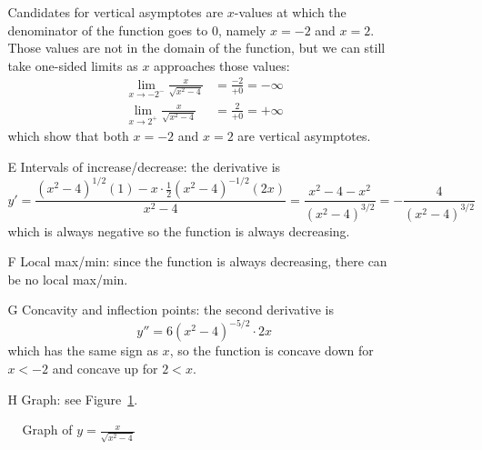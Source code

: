 \documentclass{article}
\newcommand{\ds}{\displaystyle}
\begin{document}
\begin{enumerate}
\begin{enumerate}
\begin{itemize}
      Candidates for vertical asymptotes are $x$-values at which the
      denominator of the function goes to $0$, namely $x=-2$ and
      $x=2$.  Those values are not in the domain of the function, but
      we can still take one-sided limits as $x$ approaches those
      values:
      \begin{align*}
        \lim_{x\to -2^-} \frac{x}{\sqrt{x^2-4}} &= \frac{-2}{+0} = -\infty
        \\
        \lim_{x\to 2^+} \frac{x}{\sqrt{x^2-4}} &= \frac{2}{+0} = +\infty
      \end{align*}
      which show that both $x=-2$ and $x=2$ are vertical asymptotes.
    \item[E] Intervals of increase/decrease: the derivative is
      \begin{displaymath}
        y'=\frac{(x^2-4)^{1/2}(1)-x\cdot\frac{1}{2}(x^2-4)^{-1/2}(2x)}{x^2-4}
        = \frac{x^2-4-x^2}{(x^2-4)^{3/2}} = -\frac{4}{(x^2-4)^{3/2}}
      \end{displaymath}
      which is always negative so the function is always decreasing.
    \item[F] Local max/min: since the function is always decreasing,
      there can be no local max/min.
    \item[G] Concavity and inflection points: the second derivative is
      \begin{displaymath}
        y'' = 6(x^2-4)^{-5/2}\cdot 2x
      \end{displaymath}
      which has the same sign as $x$, so the function is concave down
      for $x<-2$ and concave up for $2<x$.
    \item[H] Graph: see Figure~\ref{fig:xoversqrtx2-4}.
    \end{itemize}
    \begin{figure}[htbp]
      \centering
      \caption{Graph of $\ds y=\frac{x}{\sqrt{x^2-4}}$}
      \label{fig:xoversqrtx2-4}
    \end{figure}    
  \end{enumerate}

\end{enumerate}
\end{document}
